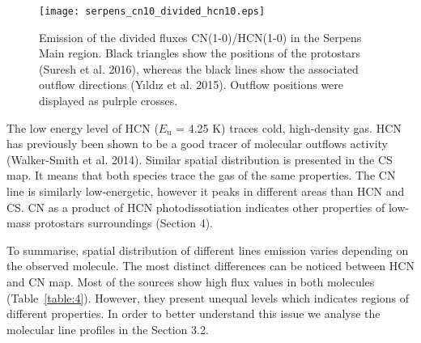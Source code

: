 \documentclass{aa}
\begin{document}
\begin{figure}
   \centering
   \texttt{[image: serpens\_cn10\_divided\_hcn10.eps]}
      \caption{Emission of the divided fluxes CN(1-0)/HCN(1-0) in the Serpens Main region. Black triangles show the positions of the protostars (Suresh et al. 2016), whereas the black lines show the associated outflow directions (Y{\i}ld{\i}z et al. 2015). Outflow positions were displayed as pulrple crosses.}
         \label{cn10_div_hcn10}
   \end{figure}

The low energy level of HCN ($E_\mathrm{u}$ = 4.25 K) traces cold, high-density gas. HCN has previously been shown to be a good tracer of molecular outflows activity (Walker-Smith et al. 2014). Similar spatial distribution is presented in the CS map. It means that both species trace the gas of the same properties. The CN line is similarly low-energetic, however it peaks in different areas than HCN and CS. CN as a product of HCN photodissotiation indicates other properties of low-mass protostars surroundings (Section 4).

To summarise, spatial distribution of different lines emission varies depending on the observed molecule. The most distinct differences can be noticed between HCN and CN map. Most of the sources show high flux values in both molecules (Table~\ref{table:4}). However, they present unequal levels which indicates regions of different properties. In order to better understand this issue we analyse the molecular line profiles in the Section 3.2. 
\end{document}
